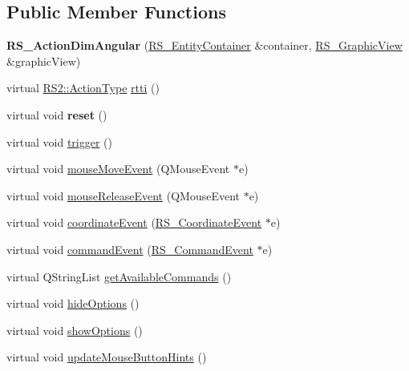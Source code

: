 \subsection*{Public Member Functions}
\begin{DoxyCompactItemize}
\item 
\hypertarget{classRS__ActionDimAngular_a0d6e5b4d1f8102d713d9d5240e1c321c}{{\bfseries R\-S\-\_\-\-Action\-Dim\-Angular} (\hyperlink{classRS__EntityContainer}{R\-S\-\_\-\-Entity\-Container} \&container, \hyperlink{classRS__GraphicView}{R\-S\-\_\-\-Graphic\-View} \&graphic\-View)}\label{classRS__ActionDimAngular_a0d6e5b4d1f8102d713d9d5240e1c321c}

\item 
virtual \hyperlink{classRS2_afe3523e0bc41fd637b892321cfc4b9d7}{R\-S2\-::\-Action\-Type} \hyperlink{classRS__ActionDimAngular_aeae5f2d7fa452914b243ba30dd5967c2}{rtti} ()
\item 
\hypertarget{classRS__ActionDimAngular_a0e7c9da0a8514678f8344e9fee56a13f}{virtual void {\bfseries reset} ()}\label{classRS__ActionDimAngular_a0e7c9da0a8514678f8344e9fee56a13f}

\item 
virtual void \hyperlink{classRS__ActionDimAngular_a93934a798c23e4b2cef18072b710d003}{trigger} ()
\item 
virtual void \hyperlink{classRS__ActionDimAngular_ace4cde4002ff1dd3010a319accaf117f}{mouse\-Move\-Event} (Q\-Mouse\-Event $\ast$e)
\item 
virtual void \hyperlink{classRS__ActionDimAngular_afa92edada39ca8d2b01543c854a28f6f}{mouse\-Release\-Event} (Q\-Mouse\-Event $\ast$e)
\item 
virtual void \hyperlink{classRS__ActionDimAngular_a4cb9b2bdd196959657f83293b6f8366f}{coordinate\-Event} (\hyperlink{classRS__CoordinateEvent}{R\-S\-\_\-\-Coordinate\-Event} $\ast$e)
\item 
virtual void \hyperlink{classRS__ActionDimAngular_ae33bdc08acf8a44232ad414e9ed2d66b}{command\-Event} (\hyperlink{classRS__CommandEvent}{R\-S\-\_\-\-Command\-Event} $\ast$e)
\item 
virtual Q\-String\-List \hyperlink{classRS__ActionDimAngular_a02d8e0a13536d5d540657004d7d7332d}{get\-Available\-Commands} ()
\item 
virtual void \hyperlink{classRS__ActionDimAngular_a8e3211cbe99d3ef0d84c3b88be9fe237}{hide\-Options} ()
\item 
virtual void \hyperlink{classRS__ActionDimAngular_a23f1129a2faae789052e504deaa804e3}{show\-Options} ()
\item 
virtual void \hyperlink{classRS__ActionDimAngular_a2b5315e198e95602a71eb52599ac7724}{update\-Mouse\-Button\-Hints} ()
\end{DoxyCompactItemize}
